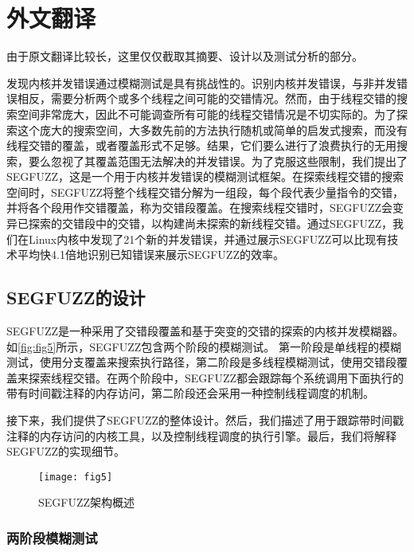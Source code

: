 \cleardoublepage

\newrefsection

\chapter{外文翻译}

由于原文翻译比较长，这里仅仅截取其摘要、设计以及测试分析的部分。


发现内核并发错误通过模糊测试是具有挑战性的。识别内核并发错误，与非并发错误相反，需要分析两个或多个线程之间可能的交错情况。然而，由于线程交错的搜索空间非常庞大，因此不可能调查所有可能的线程交错情况是不切实际的。为了探索这个庞大的搜索空间，大多数先前的方法执行随机或简单的启发式搜索，而没有线程交错的覆盖，或者覆盖形式不足够。结果，它们要么进行了浪费执行的无用搜索，要么忽视了其覆盖范围无法解决的并发错误。为了克服这些限制，我们提出了SEGFUZZ，这是一个用于内核并发错误的模糊测试框架。在探索线程交错的搜索空间时，SEGFUZZ将整个线程交错分解为一组段，每个段代表少量指令的交错，并将各个段用作交错覆盖，称为交错段覆盖。在搜索线程交错时，SEGFUZZ会变异已探索的交错段中的交错，以构建尚未探索的新线程交错。通过SEGFUZZ，我们在Linux内核中发现了21个新的并发错误，并通过展示SEGFUZZ可以比现有技术平均快4.1倍地识别已知错误来展示SEGFUZZ的效率。

\section{SEGFUZZ的设计}

SEGFUZZ是一种采用了交错段覆盖和基于突变的交错的探索的内核并发模糊器。如\autoref{fig:fig5}所示，SEGFUZZ包含两个阶段的模糊测试。 第一阶段是单线程的模糊测试，使用分支覆盖来搜索执行路径，第二阶段是多线程模糊测试，使用交错段覆盖来探索线程交错。在两个阶段中，SEGFUZZ都会跟踪每个系统调用下面执行的带有时间戳注释的内存访问，第二阶段还会采用一种控制线程调度的机制。
    
接下来，我们提供了SEGFUZZ的整体设计。然后，我们描述了用于跟踪带时间戳注释的内存访问的内核工具，以及控制线程调度的执行引擎。最后，我们将解释SEGFUZZ的实现细节。

\begin{figure}[ht]
    \centering
    \texttt{[image: fig5]}
    \caption{\label{fig:fig5}SEGFUZZ架构概述}
\end{figure}

\subsection{两阶段模糊测试}

